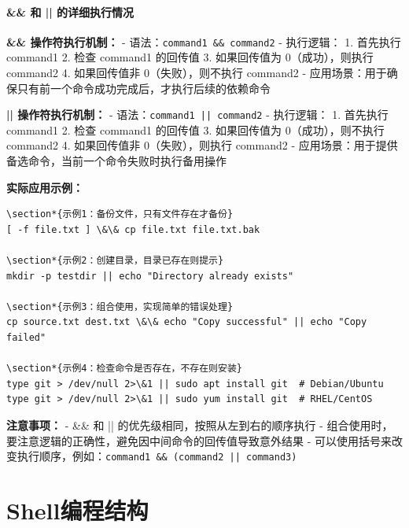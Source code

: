 \documentclass[12pt,UTF8]{ctexbook}
\begin{document}
\paragraph{\&\& 和 || 的详细执行情况}

\textbf{\&\& 操作符执行机制：}
- 语法：\texttt{command1 \&\& command2}
- 执行逻辑：
  1. 首先执行 command1
  2. 检查 command1 的回传值
  3. 如果回传值为 0（成功），则执行 command2
  4. 如果回传值非 0（失败），则不执行 command2
- 应用场景：用于确保只有前一个命令成功完成后，才执行后续的依赖命令

\textbf{|| 操作符执行机制：}
- 语法：\texttt{command1 || command2}
- 执行逻辑：
  1. 首先执行 command1
  2. 检查 command1 的回传值
  3. 如果回传值为 0（成功），则不执行 command2
  4. 如果回传值非 0（失败），则执行 command2
- 应用场景：用于提供备选命令，当前一个命令失败时执行备用操作

\textbf{实际应用示例：}
\begin{verbatim}
\section*{示例1：备份文件，只有文件存在才备份}
[ -f file.txt ] \&\& cp file.txt file.txt.bak

\section*{示例2：创建目录，目录已存在则提示}
mkdir -p testdir || echo "Directory already exists"

\section*{示例3：组合使用，实现简单的错误处理}
cp source.txt dest.txt \&\& echo "Copy successful" || echo "Copy failed"

\section*{示例4：检查命令是否存在，不存在则安装}
type git > /dev/null 2>\&1 || sudo apt install git  # Debian/Ubuntu
type git > /dev/null 2>\&1 || sudo yum install git  # RHEL/CentOS
\end{verbatim}

\textbf{注意事项：}
- \&\& 和 || 的优先级相同，按照从左到右的顺序执行
- 组合使用时，要注意逻辑的正确性，避免因中间命令的回传值导致意外结果
- 可以使用括号来改变执行顺序，例如：\texttt{command1 \&\& (command2 || command3)}

\section{Shell编程结构}
\end{document}
